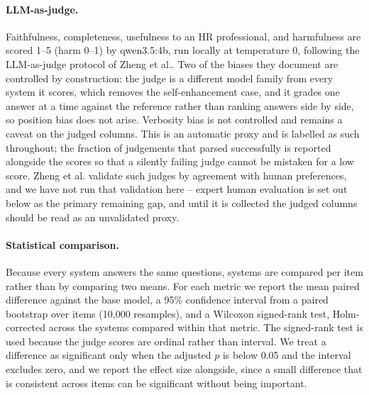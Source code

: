 \documentclass[11pt,a4paper]{article}
\begin{document}
\paragraph{LLM-as-judge.} Faithfulness, completeness, usefulness to an HR professional, and harmfulness are scored 1--5 (harm 0--1) by qwen3.5:4b, run locally at temperature 0, following the LLM-as-judge protocol of Zheng et al.\cite{ref_llmjudge}. Two of the biases they document are controlled by construction: the judge is a different model family from every system it scores, which removes the self-enhancement case, and it grades one answer at a time against the reference rather than ranking answers side by side, so position bias does not arise. Verbosity bias is not controlled and remains a caveat on the judged columns. This is an automatic proxy and is labelled as such throughout; the fraction of judgements that parsed successfully is reported alongside the scores so that a silently failing judge cannot be mistaken for a low score. Zheng et al. validate such judges by agreement with human preferences, and we have not run that validation here -- expert human evaluation is set out below as the primary remaining gap, and until it is collected the judged columns should be read as an unvalidated proxy.

\paragraph{Statistical comparison.} Because every system answers the same questions, systems are compared per item rather than by comparing two means. For each metric we report the mean paired difference against the base model, a 95\% confidence interval from a paired bootstrap over items (10{,}000 resamples), and a Wilcoxon signed-rank test, Holm-corrected across the systems compared within that metric. The signed-rank test is used because the judge scores are ordinal rather than interval. We treat a difference as significant only when the adjusted $p$ is below 0.05 and the interval excludes zero, and we report the effect size alongside, since a small difference that is consistent across items can be significant without being important.
\end{document}
